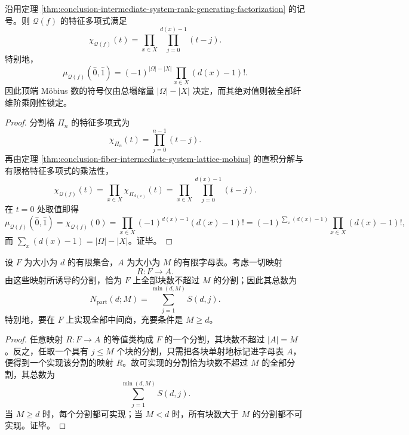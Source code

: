 \begin{corollary}[中间系统格的特征多项式与符号刚性]\label{cor:conclusion-intermediate-system-characteristic-polynomial-sign-rigidity}
沿用定理 \ref{thm:conclusion-intermediate-system-rank-generating-factorization} 的记号。则 \(\mathcal Q(f)\) 的特征多项式满足
\[
\chi_{\mathcal Q(f)}(t)
=
\prod_{x\in X}\prod_{j=0}^{d(x)-1}(t-j).
\]
特别地，
\[
\mu_{\mathcal Q(f)}(\hat0,\hat1)
=
(-1)^{|\Omega|-|X|}
\prod_{x\in X}(d(x)-1)!.
\]
因此顶端 Möbius 数的符号仅由总塌缩量 \(|\Omega|-|X|\) 决定，而其绝对值则被全部纤维阶乘刚性锁定。
\end{corollary}
\begin{proof}
分割格 \(\Pi_n\) 的特征多项式为
\[
\chi_{\Pi_n}(t)=\prod_{j=0}^{n-1}(t-j).
\]
再由定理 \ref{thm:conclusion-fiber-intermediate-system-lattice-mobius} 的直积分解与有限格特征多项式的乘法性，
\[
\chi_{\mathcal Q(f)}(t)
=
\prod_{x\in X}\chi_{\Pi_{d(x)}}(t)
=
\prod_{x\in X}\prod_{j=0}^{d(x)-1}(t-j).
\]
在 \(t=0\) 处取值即得
\[
\mu_{\mathcal Q(f)}(\hat0,\hat1)
=
\chi_{\mathcal Q(f)}(0)
=
\prod_{x\in X}(-1)^{d(x)-1}(d(x)-1)!
=
(-1)^{\sum_x(d(x)-1)}\prod_{x\in X}(d(x)-1)!,
\]
而 \(\sum_x(d(x)-1)=|\Omega|-|X|\)。证毕。
\end{proof}

\begin{theorem}[有限残差字母表可实现的中间商数目的精确上界]\label{thm:conclusion-finite-alphabet-intermediate-quotient-count}
设 \(F\) 为大小为 \(d\) 的有限集合，\(A\) 为大小为 \(M\) 的有限字母表。考虑一切映射
\[
R:F\to A.
\]
由这些映射所诱导的分割，恰为 \(F\) 上全部块数不超过 \(M\) 的分割；因此其总数为
\[
N_{\mathrm{part}}(d;M)=\sum_{j=1}^{\min(d,M)}S(d,j).
\]
特别地，要在 \(F\) 上实现全部中间商，充要条件是 \(M\ge d\)。
\end{theorem}
\begin{proof}
任意映射 \(R:F\to A\) 的等值类构成 \(F\) 的一个分割，其块数不超过 \(|A|=M\)。反之，任取一个具有 \(j\le M\) 个块的分割，只需把各块单射地标记进字母表 \(A\)，便得到一个实现该分割的映射 \(R\)。故可实现的分割恰为块数不超过 \(M\) 的全部分割，其总数为
\[
\sum_{j=1}^{\min(d,M)}S(d,j).
\]
当 \(M\ge d\) 时，每个分割都可实现；当 \(M<d\) 时，所有块数大于 \(M\) 的分割都不可实现。证毕。
\end{proof}

